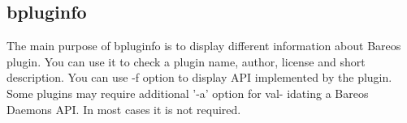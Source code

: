 %
%
%
%
%


\subsection{bpluginfo}
\label{bpluginfo}

The main purpose of bpluginfo is to display different information about Bareos plugin. You can
use it to check a plugin name, author, license and short description. You can use -f option  to
display API implemented by the plugin. Some plugins may require additional '-a' option for val-
idating a Bareos Daemons API. In most cases it is not required.
